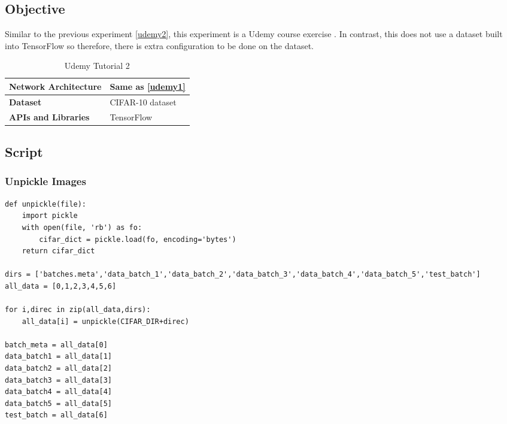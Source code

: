 \tocless\subsection{Objective}
Similar to the previous experiment \ref{udemy2}, this experiment is a Udemy course exercise \parencite{udemy}. In contrast, this does not use a dataset built into TensorFlow so therefore, there is extra configuration to be done on the dataset.

\begin{table}[h]
\centering
\caption{Udemy Tutorial 2}
\label{my-label}
\begin{tabular}{|l|p{8cm}|}
\hline
\textbf{Network Architecture} & Same as \ref{udemy1}            \\ \hline
\textbf{Dataset}              & CIFAR-10 dataset \\ \hline
\textbf{APIs and Libraries}   & TensorFlow                                                         \\ \hline
\end{tabular}
\end{table}

\tocless\subsection{Script}
\tocless\subsubsection{Unpickle Images}
\begin{lstlisting}[style=Python]
def unpickle(file):
    import pickle
    with open(file, 'rb') as fo:
        cifar_dict = pickle.load(fo, encoding='bytes')
    return cifar_dict

dirs = ['batches.meta','data_batch_1','data_batch_2','data_batch_3','data_batch_4','data_batch_5','test_batch']
all_data = [0,1,2,3,4,5,6]

for i,direc in zip(all_data,dirs):
    all_data[i] = unpickle(CIFAR_DIR+direc)

batch_meta = all_data[0]
data_batch1 = all_data[1]
data_batch2 = all_data[2]
data_batch3 = all_data[3]
data_batch4 = all_data[4]
data_batch5 = all_data[5]
test_batch = all_data[6]
\end{lstlisting}

